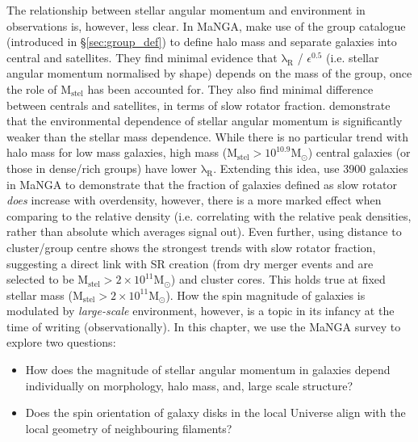 The relationship between stellar angular momentum and environment in observations is, however, less clear. In MaNGA, \citet{greene2018} make use of the \citet{yang2007} group catalogue (introduced in \S\ref{sec:group_def}) to define halo mass and separate galaxies into central and satellites. They find minimal evidence that $\mathrm{\lambda_R}$ / $\epsilon^{0.5}$ (i.e. stellar angular momentum normalised by shape) depends on the mass of the group, once the role of $\mathrm{M_{stel}}$ has been accounted for. They also find minimal difference between centrals and satellites, in terms of slow rotator fraction. \citet{wang2020} demonstrate that the environmental dependence of stellar angular momentum is significantly weaker than the stellar mass dependence. While there is no particular trend with halo mass for low mass galaxies, high mass ($\mathrm{M_{stel} > 10^{10.9} M_{\odot}}$) central galaxies (or those in dense/rich groups) have lower $\mathrm{\lambda_R}$. Extending this idea, \citet{graham2019} use 3900 galaxies in MaNGA to demonstrate that the fraction of galaxies defined as slow rotator \textit{does} increase with overdensity, however, there is a more marked effect when comparing to the relative density (i.e. correlating with the relative peak densities, rather than absolute which averages signal out). Even further, using distance to cluster/group centre shows the strongest trends with slow rotator fraction, suggesting a direct link with SR creation (from dry merger events and are selected to be $\mathrm{M_{stel} > 2\times10^{11} M_{\odot}}$) and cluster cores. This holds true at fixed stellar mass ($\mathrm{M_{stel} > 2\times10^{11} M_{\odot}}$). How the spin magnitude of galaxies is modulated by \textit{large-scale} environment, however, is a topic in its infancy at the time of writing (observationally). In this chapter, we use the MaNGA survey to explore two questions:

\begin{itemize}
    \item How does the magnitude of stellar angular momentum in galaxies depend individually on morphology, halo mass, and, large scale structure?
    \item Does the spin orientation of galaxy disks in the local Universe align with the local geometry of neighbouring filaments?
\end{itemize}

